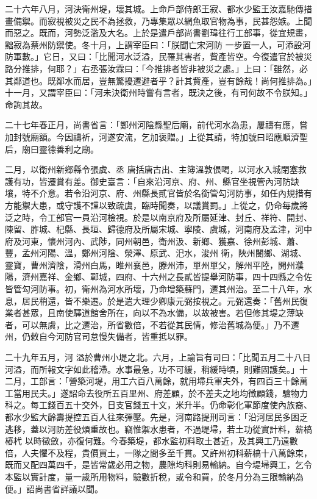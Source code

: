 \begin{pinyinscope}
 二十六年八月，河決衛州堤，壞其城。上命戶部侍郎王寂、都水少監王汝嘉馳傳措畫備禦。而寂視被災之民不為拯救，乃專集眾以網魚取官物為事，民甚怨嫉。上聞而惡之。既而，河勢泛濫及大名。上於是遣戶部尚書劉瑋往行工部事，從宜規畫，黜寂為蔡州防禦使。冬十月，上謂宰臣曰：「朕聞亡宋河防
 一步置一人，可添設河防軍數。」它日，又曰：「比聞河水泛溢，民罹其害者，貲產皆空。今復遣官於被災路分推排，何耶？」右丞張汝霖曰：「今推排者皆非被災之處。」上曰：「雖然，必其鄰道也。既鄰水而居，豈無驚擾遷避者乎？計其貲產，豈有餘哉！尚何推排為。」十一月，又謂宰臣曰：「河未決衛州時嘗有言者，既決之後，有司何故不令朕知。」命詢其故。



 二十七年春正月，尚書省言：「鄭州河陰縣聖后廟，前代河水為患，屢禱有應，嘗加封號廟額。今因禱祈，河遂安流，乞加褒贈。」上從其請，特加號曰昭應順濟聖后，廟曰靈德善利之廟。



 二月，以衛州新鄉縣令張虡、丞
 唐括唐古出、主簿溫敦偎喝，以河水入城閉塞救護有功，皆遷賞有差。御史臺言：「自來沿河京、府、州、縣官坐視管內河防缺壤，特不介意。若令沿河京、府、州縣長貳官皆於名銜管勾河防事，如任內規措有方能禦大患，或守護不謹以致疏虞，臨時聞奏，以議賞罰。」上從之，仍命每歲將泛之時，令工部官一員沿河檢視。於是以南京府及所屬延津、封丘、祥符、開封、陳留、胙城、杞縣、長垣、歸德府及所屬宋城、寧陵、虞城，河南府及孟津，河中府及河東，懷州河內、武陟，同州朝邑，衛州汲、新鄉、獲嘉、徐州彭城、蕭、豐，孟州河陽、溫，鄭州河陰、滎澤、原武、汜水，浚州
 衛，陜州閿鄉、湖城、靈寶，曹州濟陰，滑州白馬，睢州襄邑，滕州沛，單州單父，解州平陸，開州濮陽，濟州嘉祥、金鄉、鄆城，四府、十六州之長貳皆提舉河防事，四十四縣之令佐皆管勾河防事。初，衛州為河水所壞，乃命增築蘇門，遷其州治。至二十八年，水息，居民稍還，皆不樂遷。於是遣大理少卿康元弼按視之。元弼還奏：「舊州民復業者甚眾，且南使驛道館舍所在，向以不為水備，以故被害。若但修其堤之薄缺者，可以無虞，比之遷治，所省數倍，不若從其民情，修治舊城為便。」乃不遷州，仍敕自今河防官司怠慢失備者，皆重抵以罪。



 二十九年五月，河
 溢於曹州小堤之北。六月，上諭旨有司曰：「比聞五月二十八日河溢，而所報文字如此稽滯。水事最急，功不可緩，稍緩時頃，則難固護矣。」十二月，工部言：「營築河堤，用工六百八萬餘，就用埽兵軍夫外，有四百三十餘萬工當用民夫。」遂詔命去役所五百里州、府差顧，於不差夫之地均徵顧錢，驗物力科之。每工錢百五十交外，日支官錢五十文，米升半。仍命彰化軍節度使內族裔、都水少監大齡壽提控五百人往來彈壓。先是，河南路提刑司言：「沿河居民多困乏逃移，蓋以河防差役煩重故也。竊惟禦水患者，不過堤埽，若土功從實計料，薪槁樁杙
 以時徵斂，亦復何難。今春築堤，都水監初料取土甚近，及其興工乃遠數倍，人夫懼不及程，貴價買土，一隊之間多至千貫。又許州初科薪槁十八萬餘束，既而又配四萬四千，是皆常歲必用之物，農隙均科則易輸納。自今堤埽興工，乞令本監以實計度，量一歲所用物料，驗數折稅，或令和買，於冬月分為三限輸納為便。」詔尚書省詳議以聞。




\end{pinyinscope}
